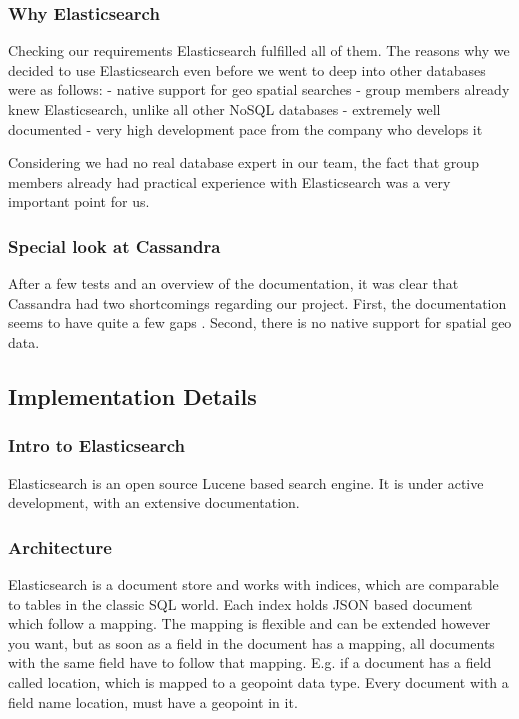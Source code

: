 \subsubsection{Why Elasticsearch}\label{why-elasticsearch}

Checking our requirements Elasticsearch fulfilled all of them. The
reasons why we decided to use Elasticsearch even before we went to deep
into other databases were as follows: - native support for geo spatial
searches \cite{McCandless.2016} - group members already knew Elasticsearch,
unlike all other NoSQL databases - extremely well documented - very high
development pace from the company who develops it

Considering we had no real database expert in our team, the fact that
group members already had practical experience with Elasticsearch was a
very important point for us.

\subsubsection{Special look at Cassandra}\label{special-look-at-cassandra}

After a few tests and an overview of the documentation, it was clear
that Cassandra had two shortcomings regarding our project. First, the
documentation seems to have quite a few gaps \cite{cassandra, cassandra2}. Second, there is no native support for spatial geo data.

\subsection{Implementation Details}\label{implementation-details}

\subsubsection{Intro to Elasticsearch}\label{intro-to-elasticsearch}

Elasticsearch \cite{eastic} is an open source Lucene based search
engine. It is under active development, with an extensive documentation.

\subsubsection{Architecture}\label{architecture}

Elasticsearch is a document store and works with indices, which are
comparable to tables in the classic SQL world. Each index holds JSON
based document which follow a mapping. The mapping is flexible and can
be extended however you want, but as soon as a field in the document has
a mapping, all documents with the same field have to follow that
mapping. E.g. if a document has a field called location, which is mapped
to a geopoint data type. Every document with a field name location, must
have a geopoint in it.

